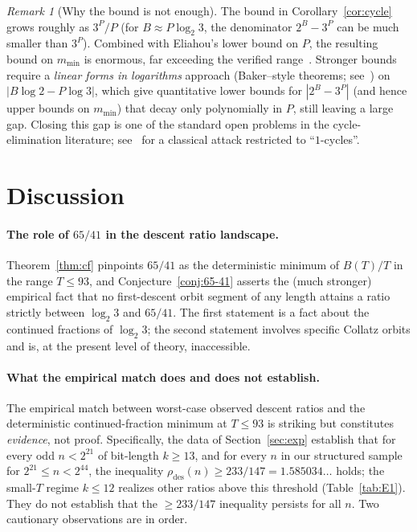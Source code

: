 \documentclass[11pt,a4paper]{article}
\theoremstyle{definition}
\theoremstyle{remark}
\newtheorem{remark}[theorem]{Remark}
\begin{document}
\begin{remark}[Why the bound is not enough]\label{rem:gap}
The bound in Corollary~\ref{cor:cycle} grows roughly as $3^P / P$
(for $B \approx P \log_2 3$, the denominator $2^B - 3^P$ can be
much smaller than $3^P$).  Combined with Eliahou's lower bound on
$P$, the resulting bound on $m_{\min}$ is enormous, far exceeding
the verified range~\cite{BarinaCheckup}.  Stronger bounds require a
\emph{linear forms in logarithms} approach (Baker--style theorems;
see~\cite{Baker1990}) on $|B \log 2 - P \log 3|$, which give
quantitative lower bounds for $|2^B - 3^P|$ (and hence upper bounds
on $m_{\min}$) that decay only polynomially in $P$, still leaving a
large gap.  Closing this gap is one of the standard open problems in
the cycle-elimination literature; see~\cite{Steiner1977} for a
classical attack restricted to ``$1$-cycles''.
\end{remark}

\section{Discussion}\label{sec:disc}

\paragraph{The role of $65/41$ in the descent ratio landscape.}
Theorem~\ref{thm:cf} pinpoints $65/41$ as the deterministic minimum
of $B(T)/T$ in the range $T \leq 93$, and Conjecture~\ref{conj:65-41}
asserts the (much stronger) empirical fact that no first-descent
orbit segment of any length attains a ratio strictly between
$\log_2 3$ and $65/41$.  The first statement is a fact about the
continued fractions of $\log_2 3$; the second statement involves
specific Collatz orbits and is, at the present level of theory,
inaccessible.

\paragraph{What the empirical match does and does not establish.}
The empirical match between worst-case observed descent ratios and
the deterministic continued-fraction minimum at $T \leq 93$ is
striking but constitutes \emph{evidence}, not proof.  Specifically,
the data of Section~\ref{sec:exp} establish that for every odd
$n < 2^{21}$ of bit-length $k \geq 13$, and for every $n$ in our
structured sample for $2^{21} \leq n < 2^{44}$, the inequality
$\rho_{\mathrm{des}}(n) \geq 233/147 = 1.585034\ldots$ holds; the
small-$T$ regime $k \leq 12$ realizes other ratios above this
threshold (Table~\ref{tab:E1}).  They do not establish that the
$\geq 233/147$ inequality persists for all $n$.  Two cautionary
observations are in order.
\end{document}
